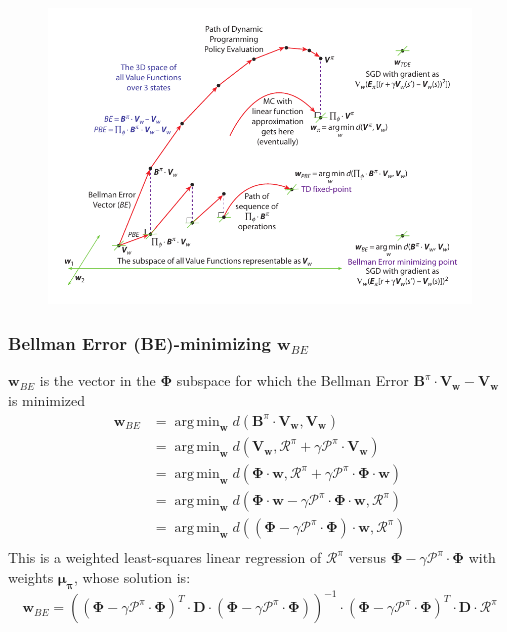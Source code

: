 \documentclass[handout]{beamer}
\DeclareMathOperator*{\argmin}{arg\,min}
\newcommand{\vw}{\bm{V_w}}
\newcommand{\bphi}{\bm{\Phi}}
\newcommand{\bb}{\bm{B}^{\pi}}
\newcommand{\bmu}{\bm{\mu_{\pi}}}
\newcommand{\bd}{\bm{D}}
\newcommand{\bw}{\bm{w}}
\newcommand{\brew}{\bm{\mathcal{R}}^{\pi}}
\newcommand{\bprob}{\bm{\mathcal{P}}^{\pi}}
\begin{document}
\begin{frame}
\begin{figure}
\includegraphics[scale=0.8]{vf_geometry.pdf}
\end{figure}
\end{frame}

\begin{frame}
\frametitle{Bellman Error (BE)-minimizing $\bm{w}_{BE}$}
\pause
$\bm{w}_{BE}$ is the vector in the $\bphi$ subspace for which the Bellman Error $\bb \cdot \vw - \vw$ is minimized
\begin{align*}
\bm{w}_{BE} & =  \argmin_{\bw} d(\bb \cdot \vw, \vw) \\
& = \argmin_{\bw} d(\vw, \brew + \gamma \bprob \cdot \vw) \\
& = \argmin_{\bw} d(\bphi \cdot \bw, \brew + \gamma \bprob \cdot \bphi \cdot \bw)\\
& = \argmin_{\bw} d(\bphi \cdot \bw - \gamma \bprob \cdot \bphi \cdot \bw, \brew)\\
& = \argmin_{\bw} d((\bphi - \gamma \bprob \cdot \bphi) \cdot \bw, \brew )\\
\end{align*}
\pause
This is a weighted least-squares linear regression of $\brew$ versus $\bphi - \gamma \bprob \cdot \bphi$
with weights $\bmu$, whose solution is:
\pause
$$\bm{w}_{BE} = ((\bphi - \gamma \bprob \cdot \bphi)^T \cdot \bd \cdot (\bphi - \gamma \bprob \cdot \bphi))^{-1} \cdot (\bphi - \gamma \bprob \cdot \bphi)^T \cdot \bd \cdot \brew$$
\end{frame}
\end{document}
